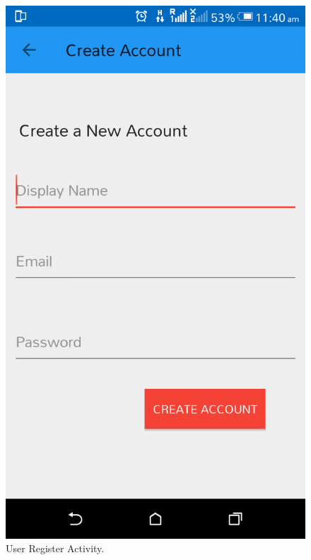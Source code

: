 \begin{appendices}
\begin{figure}[!ht]
	\centering
	\includegraphics[scale=0.2]{register-page.png}
	\caption{\label{img19}  User Register Activity.}
\end{figure}


\end{appendices}
